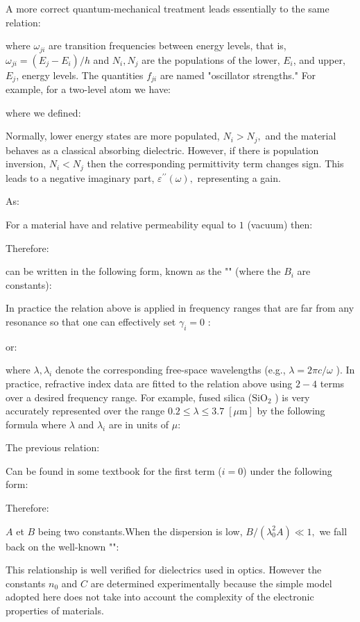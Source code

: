 	
	\begin{tcolorbox}[title=Remark,colframe=black,arc=10pt]
	A more correct quantum-mechanical treatment leads essentially to the same relation:
	
	where $\omega_{j i}$ are transition frequencies between energy levels, that is, $\omega_{j i}=\left(E_{j}-E_{i}\right) / h$ and $N_{i}, N_{j}$ are the populations of the lower, $E_{i}$, and upper, $E_{j}$, energy levels. The quantities $f_{j i}$ are named "oscillator strengths." For example, for a two-level atom we have:
	
	where we defined:
	
	Normally, lower energy states are more populated, $N_{i}>N_{j},$ and the material behaves as a classical absorbing dielectric. However, if there is population inversion, $N_{i}<N_{j}$ then the corresponding permittivity term changes sign. This leads to a negative imaginary part, $\varepsilon^{\prime \prime}(\omega),$ representing a gain.
	\end{tcolorbox}
	As:
	
	For a material have and relative permeability equal to $1$ (vacuum) then:
	
	Therefore:
	
	can be written in the following form, known as the "\label{Sellmeier equation}" (where the $B_{i}$ are constants):
	
	In practice the relation above is applied in frequency ranges that are far from any resonance so that one can effectively set $\gamma_{i}=0$ :
	
	or:
	
	where $\lambda, \lambda_{i}$ denote the corresponding free-space wavelengths (e.g., $\lambda=2 \pi c / \omega$ ). In practice, refractive index data are fitted to the relation above using $2-4$ terms over a desired frequency range. For example, fused silica ($\mathrm{SiO}_{2}$ ) is very accurately represented over the range $0.2 \leq \lambda \leq 3.7 \;[\mu \text{m}]$ by the following formula where $\lambda$ and $\lambda_{i}$ are in units of $\mu$:
	
	
	\begin{tcolorbox}[title=Remark,colframe=black,arc=10pt]
	The previous relation:
	
	Can be found in some textbook for the first term ($i=0$) under the following form:
	
	Therefore:
	
	$A$ et $B$ being two constants.When the dispersion is low, $B /\left(\lambda_{0}^{2} A\right) \ll 1,$ we fall back on the well-known "\label{Cauchy formula}":
	
	This relationship is well verified for dielectrics used in optics. However the constants $n_{0}$ and $C$ are determined experimentally because the simple model adopted here does not take into account the complexity of the electronic properties of materials.
	\end{tcolorbox}
	
